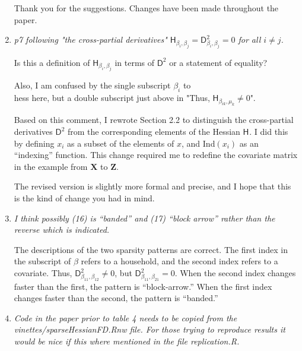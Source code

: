 \documentclass{article}
\newcommand{\parD}[3]{\mathsf{D}^{#1}_{#2}#3}
\newcommand{\hess}[2]{\mathsf{H}_{#1}#2}
\newcommand{\Mat}[1]{\mathbf{#1}}
\newenvironment{revQuote}{\itshape}{\vspace{\baselineskip}}
\newenvironment{response}{\normalfont}{\vspace{\baselineskip}}
\begin{document}
\begin{enumerate}[align=left]
\begin{response}
  Thank you for the suggestions.  Changes have been made throughout the paper.
\end{response}


\item \begin{revQuote}
p7 following "the cross-partial derivatives"
$\hess{\beta_i,\beta_j}{}=\parD{2}{\beta_i, \beta_j}{}=0$ for all $i\neq
j$.  

  Is this a definition of $\hess{\beta_i,\beta_j}{}$ in terms of  $\parD{2}{}{}$
or a statement of equality?
  
  Also, I am confused by the single subscript $\beta_i$ to \\hess here, but a
double subscript just above in "Thus, $\hess{\beta_{ik},\mu_k}{}\neq 0$".
  \end{revQuote}

\begin{response}
  Based on this comment, I rewrote Section 2.2 to distinguish the
  cross-partial derivatives $\parD{2}{}{}$ from the corresponding
  elements of the Hessian $\hess{}{}$.  I did this by defining $x_i$ as
  a subset of the elements of $x$, and Ind$(x_i)$ as an 
  ``indexing'' function.  This change required me to redefine the
  covariate matrix in the example from $\Mat{X}$ to $\Mat{Z}$.

  The revised version is slightly more formal
  and precise, and I hope that this is the kind of change you had in
  mind.
\end{response}

\item \begin{revQuote}
 I think possibly (16) is ``banded'' and (17) ``block arrow'' rather than the
reverse which is indicated.
\end{revQuote}

\begin{response}
The descriptions of the two sparsity patterns are correct. The
first index in the subscript of $\beta$ refers to a household, and the
second index refers to a covariate. Thus,
$\parD{2}{\beta_{11},\beta_{12}}{}\neq 0$, but
$\parD{2}{\beta_{11},\beta_{21}}{}=0$.  When the second index changes
faster than the first, the pattern is ``block-arrow.''  When the first
index changes faster than the second, the pattern is ``banded.''
  
\end{response}


\item \begin{revQuote}
Code in the paper prior to table 4 needs to be copied from the
vinettes/sparseHessianFD.Rnw file. For those trying to reproduce results it
would be nice if this where mentioned in the file replication.R.
  \end{revQuote}


\end{enumerate}
\end{document}
